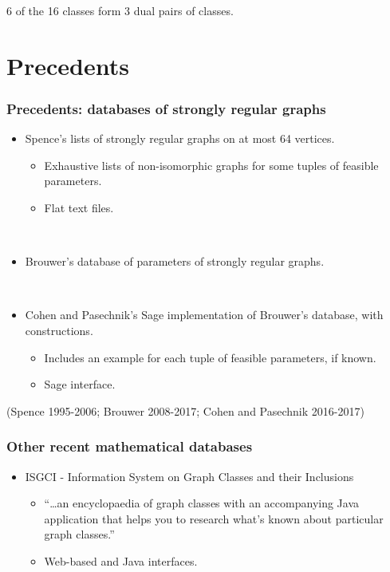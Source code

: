 \documentclass[pdf,sprung,slideColor,nocolorBG]{beamer}
\newenvironment{colortheme}[1]{
\def\ProvidesPackageRCS $##1${\relax}
\renewcommand{\ProcessOptions}{\relax}
\makeatletter

\makeatother
}{}
\newcommand{\slidecite}[1]{\tiny{(#1)}\normalsize{}}
\begin{document}
\begin{colortheme}{jubata}
\begin{frame}
\begin{figure}
\begin{minipage}{.48\textwidth}
  \label{fig:psf_9_5439_dual_cayley_graph_index_matrix}
\end{minipage}%
\end{figure}
6 of the 16 classes form 3 dual pairs of classes.
\end{frame}

\end{colortheme}

\section{Precedents}

\begin{colortheme}{seagull}
\begin{frame}
\frametitle{Precedents: databases of strongly regular graphs}
\begin{itemize}
 \item
Spence's lists of strongly regular graphs on at most 64 vertices.
 \begin{itemize}
  \item
Exhaustive lists of non-isomorphic graphs for some tuples of feasible parameters.
  \item
Flat text files.
 \end{itemize}

~

 \item
Brouwer's database of parameters of strongly regular graphs.

~

 \item
Cohen and Pasechnik's Sage implementation of Brouwer's database, with constructions.
 \begin{itemize}
  \item
Includes an example for each tuple of feasible parameters, if known.
  \item
Sage interface.
 \end{itemize}
\end{itemize}
\slidecite{Spence 1995-2006; Brouwer 2008-2017; Cohen and Pasechnik 2016-2017}
\end{frame}

\begin{frame}
\frametitle{Other recent mathematical databases}
\begin{itemize}
 \item
ISGCI - Information System on Graph Classes and their Inclusions
 \begin{itemize}
  \item
``\ldots an encyclopaedia of graph classes with an accompanying Java application that helps you to research what's known about particular graph classes.''
  \item
Web-based and Java interfaces.
 \end{itemize}


\end{itemize}
\end{frame}
\end{colortheme}
\end{document}
